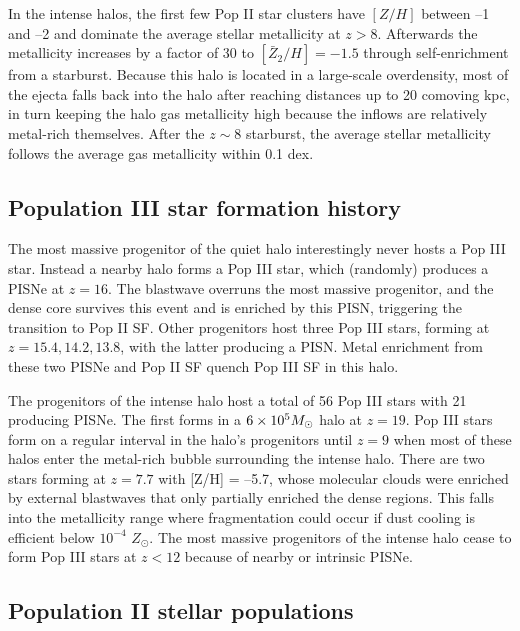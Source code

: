 \documentclass[12pt]{article}
\newcommand{\Ms}{\ifmmode{M_\odot}\else{$M_\odot$}\fi}
\newcommand\tento[1]{$10^{#1}$}
\begin{document}
In the intense halos, the first few Pop II star clusters have $[Z/H]$
between --1 and --2 and dominate the average stellar metallicity at $z
> 8$.  Afterwards the metallicity increases by a factor of 30 to
$[\bar{Z}_2/H] = -1.5$ through self-enrichment from a starburst.
Because this halo is located in a large-scale overdensity, most of the
ejecta falls back into the halo after reaching distances up to 20
comoving kpc, in turn keeping the halo gas metallicity high because
the inflows are relatively metal-rich themselves.  After the $z \sim
8$ starburst, the average stellar metallicity follows the average gas
metallicity within 0.1 dex.

\subsection*{Population III star formation history}

The most massive progenitor of the quiet halo interestingly never
hosts a Pop III star.  Instead a nearby halo forms a Pop III star,
which (randomly) produces a PISNe at $z=16$.  The blastwave overruns
the most massive progenitor, and the dense core survives this event
and is enriched by this PISN, triggering the transition to Pop II SF.
Other progenitors host three Pop III stars, forming at $z = 15.4,
14.2, 13.8$, with the latter producing a PISN.  Metal enrichment from
these two PISNe and Pop II SF quench Pop III SF in this halo.

The progenitors of the intense halo host a total of 56 Pop III stars
with 21 producing PISNe.  The first forms in a $6 \times 10^5 \Ms$
halo at $z=19$.  Pop III stars form on a regular interval in the
halo's progenitors until $z=9$ when most of these halos enter the
metal-rich bubble surrounding the intense halo.  There are two stars
forming at $z=7.7$ with [Z/H] = --5.7, whose molecular clouds were
enriched by external blastwaves that only partially enriched the dense
regions.  This falls into the metallicity range where fragmentation
could occur if dust cooling is efficient below \tento{-4} $Z_\odot$.
The most massive progenitors of the intense halo cease to form Pop III
stars at $z<12$ because of nearby or intrinsic PISNe.

\subsection*{Population II stellar populations}
\label{sec:pop}


\end{document}
